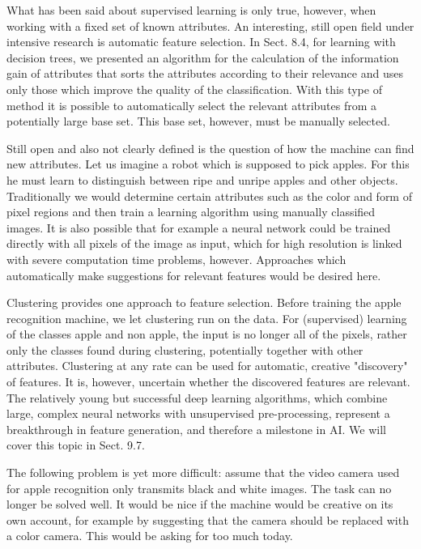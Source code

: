 \documentclass[10pt]{article}
\begin{document}
What has been said about supervised learning is only true, however, when working with a fixed set of known attributes. An interesting, still open field under intensive research is automatic feature selection. In Sect. 8.4, for learning with decision trees, we presented an algorithm for the calculation of the information gain of attributes that sorts the attributes according to their relevance and uses only those which improve the quality of the classification. With this type of method it is possible to automatically select the relevant attributes from a potentially large base set. This base set, however, must be manually selected.

Still open and also not clearly defined is the question of how the machine can find new attributes. Let us imagine a robot which is supposed to pick apples. For this he must learn to distinguish between ripe and unripe apples and other objects. Traditionally we would determine certain attributes such as the color and form of pixel regions and then train a learning algorithm using manually classified images. It is also possible that for example a neural network could be trained directly with all pixels of the image as input, which for high resolution is linked with severe computation time problems, however. Approaches which automatically make suggestions for relevant features would be desired here.

Clustering provides one approach to feature selection. Before training the apple recognition machine, we let clustering run on the data. For (supervised) learning of the classes apple and non apple, the input is no longer all of the pixels, rather only the classes found during clustering, potentially together with other attributes. Clustering at any rate can be used for automatic, creative "discovery" of features. It is, however, uncertain whether the discovered features are relevant. The relatively young but successful deep learning algorithms, which combine large, complex neural networks with unsupervised pre-processing, represent a breakthrough in feature generation, and therefore a milestone in AI. We will cover this topic in Sect. 9.7.

The following problem is yet more difficult: assume that the video camera used for apple recognition only transmits black and white images. The task can no longer be solved well. It would be nice if the machine would be creative on its own account, for example by suggesting that the camera should be replaced with a color camera. This would be asking for too much today.
\end{document}
